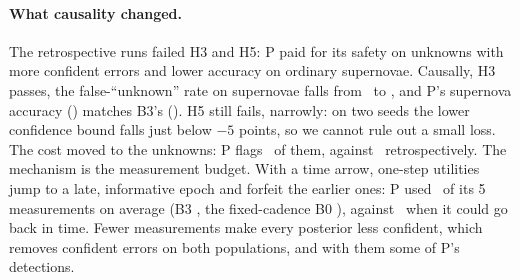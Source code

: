 \paragraph{What causality changed.} The retrospective runs failed H3 and H5: P paid for its safety on unknowns with more confident errors and lower accuracy on ordinary supernovae. Causally, H3 passes, the false-``unknown'' rate on supernovae falls from \RealRFaP\ to \RealCFaP, and P's supernova accuracy (\RealCAccModP) matches B3's (\RealCAccModBthree). H5 still fails, narrowly: on two seeds the lower confidence bound falls just below $-5$ points, so we cannot rule out a small loss. The cost moved to the unknowns: P flags \RealCFlagP\ of them, against \RealRFlagP\ retrospectively. The mechanism is the measurement budget. With a time arrow, one-step utilities jump to a late, informative epoch and forfeit the earlier ones: P used \RealCObsP\ of its 5 measurements on average (B3 \RealCObsBthree, the fixed-cadence B0 \RealCObsBzero), against \RealRObsP\ when it could go back in time. Fewer measurements make every posterior less confident, which removes confident errors on both populations, and with them some of P's detections.
